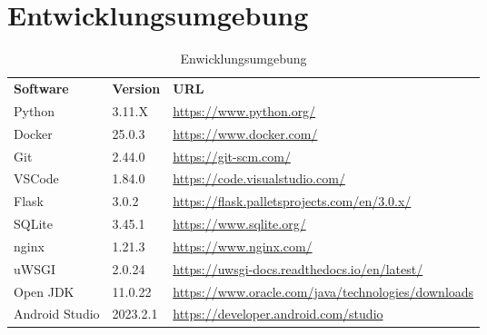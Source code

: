 \section{Entwicklungsumgebung}\label{sec:entwicklungsumgebung}


\begin{table}[h]
	\centering
	\begin{tabularx}{\textwidth}{l l X}
		\rowcolor[HTML]{C0C0C0} 
		\textbf{Software} & \textbf{Version} & \textbf{URL} \\
		Python & 3.11.X & \url{https://www.python.org/} \\
		\rowcolor[HTML]{E7E7E7} 
		Docker & 25.0.3 & \url{https://www.docker.com/} \\
		Git & 2.44.0 & \url{https://git-scm.com/} \\
		\rowcolor[HTML]{E7E7E7} 
		VSCode & 1.84.0& \url{https://code.visualstudio.com/} \\
		Flask & 3.0.2 & \url{https://flask.palletsprojects.com/en/3.0.x/} \\
		\rowcolor[HTML]{E7E7E7} 
		SQLite & 3.45.1 & \url{https://www.sqlite.org/} \\
		nginx & 1.21.3 & \url{https://www.nginx.com/} \\
		\rowcolor[HTML]{E7E7E7} 
		uWSGI & 2.0.24 & \url{https://uwsgi-docs.readthedocs.io/en/latest/} \\
		Open JDK & 11.0.22 & \url{https://www.oracle.com/java/technologies/downloads} \\
		\rowcolor[HTML]{E7E7E7} 
		Android Studio & 2023.2.1 & \url{https://developer.android.com/studio} \\
	\end{tabularx}
	\caption{Enwicklungsumgebung}
	\label{table:entwicklungsumgebung}
\end{table}
